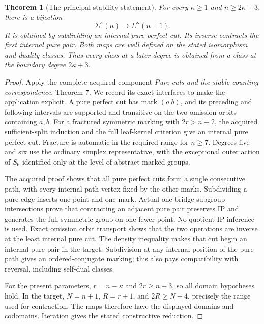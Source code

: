 \documentclass[11pt,a4paper]{article}
\newtheorem{theorem}{Theorem}\newtheorem{corollary}[theorem]{Corollary}
\begin{document}
\begin{theorem}[The principal stability statement]\label{stability}
For every $\kappa\ge1$ and $n\ge2\kappa+3$, there is a bijection
\[
                 \Sigma^\kappa(n)\longrightarrow
                 \Sigma^\kappa(n+1).
\]
It is obtained by subdividing an internal pure perfect cut. Its inverse
contracts the first internal pure pair. Both maps are well defined on
the stated isomorphism and duality classes. Thus every class at a later
degree is obtained from a class at the boundary degree $2\kappa+3$.
\end{theorem}
\begin{proof}
Apply the complete acquired component \emph{Pure cuts and the stable
counting correspondence}, Theorem 7. We record its exact interfaces to
make the application explicit. A pure perfect cut has mark $(a\ b)$,
and its preceding and following intervals are supported and transitive
on the two omission orbits containing $a,b$. For a fractured symmetric
marking with $2r>n+2$, the acquired sufficient-split induction and the
full leaf-kernel criterion give an internal pure perfect cut.
Fracture is automatic in the required range for $n\ge7$. Degrees five
and six use the ordinary simplex representative, with the exceptional
outer action of $S_6$ identified only at the level of abstract marked
groups.

The acquired proof shows that all pure perfect cuts form a single
consecutive path, with every internal path vertex fixed by the other
marks. Subdividing a pure edge inserts one point and one mark.
Actual one-bridge subgroup intersections prove that contracting an
adjacent pure pair preserves IP and generates the full symmetric group
on one fewer point. No quotient-IP inference is used. Exact omission
orbit transport shows that the two operations are inverse at the least
internal pure cut. The density inequality makes that cut begin an
internal pure pair in the target. Subdivision at any internal position
of the pure path gives an ordered-conjugate marking; this also pays
compatibility with reversal, including self-dual classes.

For the present parameters, $r=n-\kappa$ and
$2r\ge n+3$, so all domain hypotheses hold. In the target,
$N=n+1$, $R=r+1$, and $2R\ge N+4$, precisely the range used for
contraction. The maps therefore have the displayed domains and codomains.
Iteration gives the stated constructive reduction.
\end{proof}
\end{document}
